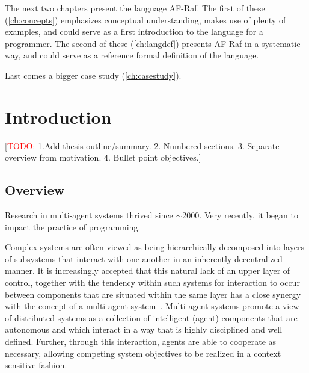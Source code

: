 \documentclass[a4paper,12pt,oneside,fleqn]{book} %
\newcommand{\rg}[1]{\marginpar{\tiny\raggedright\textcolor{blue}{\bf rg:} #1}}
\newcommand{\todo}[1]{[\textcolor{red}{TODO}: #1]}
\renewcommand{\rg}{}
\begin{document}
The next two chapters present the language AF-Raf. The first of these
(\autoref{ch:concepts}) emphasizes conceptual understanding, makes use of
plenty of examples, and could serve as a first introduction to the language
for a programmer. The second of these (\autoref{ch:langdef}) presents
AF-Raf in a systematic way, and could serve as a reference formal
definition of the language.

Last comes a bigger case study (\autoref{ch:casestudy}).

\mainmatter
\chapter{Introduction}\label{ch:intro} %

\todo{1.Add thesis outline/summary. 2. Numbered sections. 3. Separate
overview from motivation. 4. Bullet point objectives.}

\section{Overview}

Research in multi-agent systems thrived since $\sim2000$.
Very recently, it began to impact the practice of programming.

Complex systems are often viewed as being hierarchically decomposed into layers
of subsystems that interact with one another in an inherently decentralized
manner. It is increasingly accepted that this natural lack of an upper layer of
control, together with the tendency within such systems for interaction to
occur between components that are situated within the same layer has a close
synergy with the concept of a multi-agent
system~\cite{Jennings00agent-orientedsoftware}. Multi-agent systems promote a
view of distributed systems as a collection of intelligent (agent) components
that are autonomous and which interact in a way that is highly disciplined and
well defined. Further, through this interaction, agents are able to cooperate
as necessary, allowing competing system objectives to be realized in a context
sensitive fashion.
\end{document}
